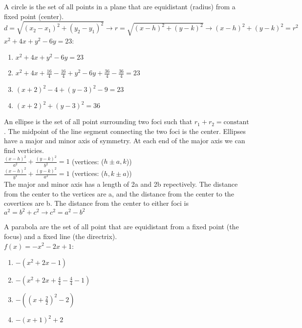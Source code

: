 \documentclass{article}
\begin{document}
A circle is the set of all points in a plane that are equidistant (radius) from a fixed point (center). $d = \sqrt{(x_2 - x_1)^2 + (y_2 - y_1)^2} \to r = \sqrt{(x - h)^2 + (y - k)^2} \to (x - h)^2 + (y - k)^2 = r^2$\\

$x^2 + 4x + y^2 - 6y = 23$:
	\begin{enumerate}
		\item $x^2 + 4x + y^2 - 6y = 23$  
		\item $x^2 + 4x + \frac{16}{4} - \frac{16}{4} + y^2 - 6y + \frac{36}{4} - \frac{36}{4} = 23$ 
		\item $(x + 2)^2 - 4 + (y - 3)^2 - 9 = 23$
		\item $(x + 2)^2 + (y - 3)^2 = 36$
	\end{enumerate}

An ellipse is the set of all point surrounding two foci such that $r_1 + r_2 = \text{constant}$. The midpoint of the line segment connecting the two foci is the center. Ellipses have a major and minor axis of symmetry. At each end of the major axis we can find verticies.\\

$\frac{(x - h)^2}{a^2} + \frac{(y - k)^2}{b^2} = 1$ (vertices: ($h \pm a, k$))\\
$\frac{(x - h)^2}{b^2} + \frac{(y - k)^2}{a^2} = 1$ (vertices: ($h, k \pm a$))\\

The major and minor axis has a length of 2a and 2b repectively. The distance from the center to the vertices are a, and the distance from the center to the covertices are b. The distance from the center to either foci is $a^2 = b^2 + c^2 \to c^2 = a^2 - b^2$ 

A parabola are the set of all point that are equidistant from a fixed point (the focus) and a fixed line (the directrix).\\

$f(x) = -x^2 - 2x + 1$:
	\begin{enumerate}
		\item $-(x^2 + 2x - 1)$
		\item $-(x^2 + 2x + \frac{4}{4} - \frac{4}{4} - 1)$ 
		\item $-((x + \frac{2}{2})^2 - 2)$ 
		\item $-(x + 1)^2 + 2$
	\end{enumerate}
\end{document}

